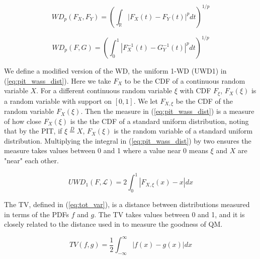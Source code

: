 \documentclass[preprint,12pt,authoryear]{elsarticle}
\newcommand{\1}[1]{\mathds{1}\left[#1\right]}
\begin{document}
\begin{equation}
    \label{eq:wass_dist_cdf}
    WD_p (F_X, F_Y) = \left( \int_{\mathbb{R}} |F_X(t) - F_Y(t)|^p dt\right)^{1/p}
\end{equation}

\begin{equation}
    \label{eq:wass_dist_quant}
    WD_p (F, G) = \left( \int_0^1 |F^{-1}_X(t) - G^{-1}_Y(t)|^p dt \right)^{1/p}
\end{equation}

We define a modified version of the WD, the uniform 1-WD (UWD1) in 
(\ref{eq:pit_wass_dist}). Here we take $F_X$ to be the CDF of a continuous 
random variable $X$. For a different continuous random variable $\xi$ with CDF 
$F_{\xi}$, $F_X(\xi)$ is a random variable with support on $[0,1]$. We let 
$F_{X,\xi}$ be the CDF of the random variable $F_X(\xi)$. Then the measure in 
(\ref{eq:pit_wass_dist}) is a measure of how close $F_X(\xi)$ is the the CDF of 
a standard uniform distribution, noting that by the PIT, if 
$\xi \overset{D}{=} X$, $F_X(\xi)$ is the random variable of a standard uniform 
distribution. Multiplying the integral in (\ref{eq:pit_wass_dist}) by two 
ensures the measure takes values between 0 and 1 \cite[]{645854} where a value 
near 0 means $\xi$ and $X$ are "near" each other.

\begin{equation}
    \label{eq:pit_wass_dist}
    UWD_1(F, \mathcal{L}) = 2\int_0^1 |F_{X,\xi} (x) - x|dx
\end{equation}



The TV, defined in (\ref{eq:tot_var}), is a distance between distributions 
measured in terms of the PDFs $f$ and $g$. The TV takes values between 0 and 1, 
and it is closely related to the distance used in 
\cite{sgouropoulos2015matching} to measure the goodness of QM.  

\begin{equation}
    \label{eq:tot_var}
    TV(f,g) = \frac{1}{2} \int_{-\infty}^{\infty}|f(x) - g(x) | dx
\end{equation}

\end{document}

